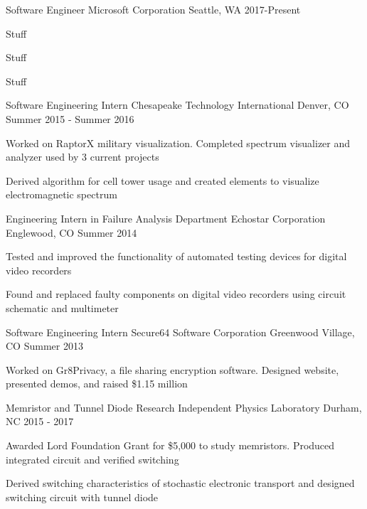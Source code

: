 \documentclass[11pt, letterpaper]{resume}
\begin{document}
\begin{cventries}
  \cventry
    {Software Engineer}
    {Microsoft Corporation}
    {Seattle, WA}
    {2017-Present}
    {
      \begin{cvitems}
        \item {Stuff}
        \item {Stuff}
        \item {Stuff}
      \end{cvitems}
    }
  \cventry
    {Software Engineering Intern}
    {Chesapeake Technology International}
    {Denver, CO}
    {Summer 2015 - Summer 2016}
    {
      \begin{cvitems}
        \item {Worked on RaptorX military visualization. Completed spectrum visualizer and analyzer used by 3 current projects}
        \item {Derived algorithm for cell tower usage and created elements to visualize electromagnetic spectrum}
      \end{cvitems}
    }
  \cventry
    {Engineering Intern in Failure Analysis Department}
    {Echostar Corporation}
    {Englewood, CO}
    {Summer 2014}
    {
      \begin{cvitems}
        \item {Tested and improved the functionality of automated testing devices for digital video recorders}
        \item {Found and replaced faulty components on digital video recorders using circuit schematic and multimeter}
      \end{cvitems}
    }
  \cventry
    {Software Engineering Intern}
    {Secure64 Software Corporation}
    {Greenwood Village, CO}
    {Summer 2013}
    {
      \begin{cvitems}
        \item {Worked on Gr8Privacy, a file sharing encryption software. Designed website, presented demos, and raised \$1.15 million}
      \end{cvitems} 
    }
  \cventry
  	{Memristor and Tunnel Diode Research}
    {Independent Physics Laboratory}
    {Durham, NC}
    {2015 - 2017}
    {
      \begin{cvitems}
      	\item {Awarded Lord Foundation Grant for \$5,000 to study memristors. Produced integrated circuit and verified switching}
        \item {Derived switching characteristics of stochastic electronic transport and designed switching circuit with tunnel diode}
      \end{cvitems}
    }
\end{cventries}
\end{document}
